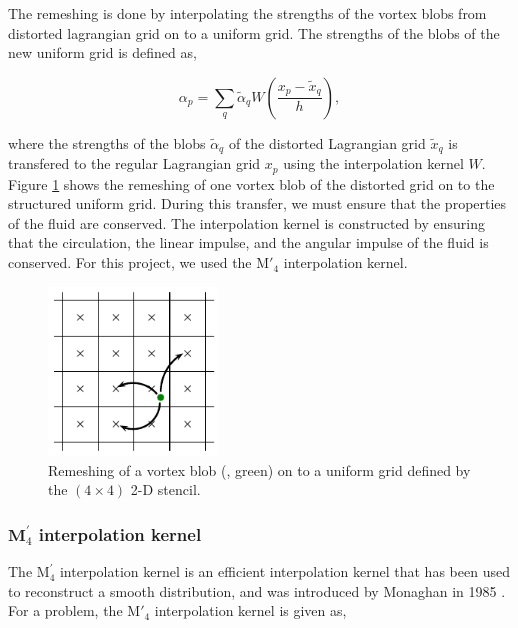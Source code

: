 The remeshing is done by interpolating the strengths of the vortex blobs from distorted lagrangian grid on to a uniform grid. The strengths of the blobs of the new uniform grid is defined as,

	\begin{equation}
	\alpha_p = \sum_q\tilde{\alpha}_q W \left(\frac{x_p - \tilde{x}_q}{h}\right),
	\end{equation}

where the strengths of the blobs $\tilde{\alpha}_q$ of the distorted Lagrangian grid $\tilde{x}_q$ is transfered to the regular Lagrangian grid $x_p$ using the interpolation kernel $W$. Figure \ref{fig:interpolationGrid} shows the remeshing of one vortex blob of the distorted grid on to the structured uniform grid. During this transfer, we must ensure that the properties of the fluid are conserved. The interpolation kernel is constructed by ensuring that the circulation, the linear impulse, and the angular impulse of the fluid is conserved. For this project, we used the $\mathrm{M}'_4$ interpolation kernel.

	\begin{figure}[t]
	\centering
	\includegraphics[width=0.4\textwidth]{figures/lagrangian/interpolationGrid.pdf}
	\caption{Remeshing of a vortex blob ({\color{plotGreen}{$\bullet$}}, green) on to a uniform grid defined by the $\left(4\times4\right)$ 2-D stencil.}
	\label{fig:interpolationGrid}
	\end{figure}

\subsubsection*{$\mathbf{M}^\prime_4$ interpolation kernel}
The $\mathrm{M}^{\prime}_4$ interpolation kernel is an efficient interpolation kernel that has been used to reconstruct a smooth distribution, and was introduced by Monaghan in 1985 \cite{Monaghan1985}. For a  problem, the $\mathrm{M}'_4$ interpolation kernel is given as,

